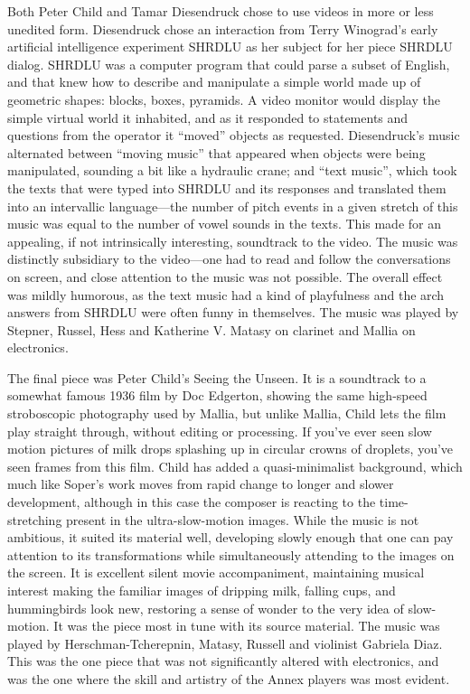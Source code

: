 Both Peter Child and Tamar Diesendruck chose to use videos in more or less unedited form. Diesendruck chose an interaction from Terry Winograd’s early artificial intelligence experiment SHRDLU as her subject for her piece SHRDLU dialog. SHRDLU was a computer program that could parse a subset of English, and that knew how to describe and manipulate a simple world made up of geometric shapes: blocks, boxes, pyramids. A video monitor would display the simple virtual world it inhabited, and as it responded to statements and questions from the operator it “moved” objects as requested. Diesendruck’s music alternated between “moving music” that appeared when objects were being manipulated, sounding a bit like a hydraulic crane; and “text music”, which took the texts that were typed into SHRDLU and its responses and translated them into an intervallic language—the number of pitch events in a given stretch of this music was equal to the number of vowel sounds in the texts. This made for an appealing, if not intrinsically interesting, soundtrack to the video. The music was distinctly subsidiary to the video—one had to read and follow the conversations on screen, and close attention to the music was not possible. The overall effect was mildly humorous, as the text music had a kind of playfulness and the arch answers from SHRDLU were often funny in themselves. The music was played by Stepner, Russel, Hess and Katherine V. Matasy on clarinet and Mallia on electronics.

The final piece was Peter Child’s Seeing the Unseen. It is a soundtrack to a somewhat famous 1936 film by Doc Edgerton, showing the same high-speed stroboscopic photography used by Mallia, but unlike Mallia, Child lets the film play straight through, without editing or processing. If you’ve ever seen slow motion pictures of milk drops splashing up in circular crowns of droplets, you’ve seen frames from this film. Child has added a quasi-minimalist background, which much like Soper’s work moves from rapid change to longer and slower development, although in this case the composer is reacting to the time-stretching present in the ultra-slow-motion images. While the music is not ambitious, it suited its material well, developing slowly enough that one can pay attention to its transformations while simultaneously attending to the images on the screen. It is excellent silent movie accompaniment, maintaining musical interest making the familiar images of dripping milk, falling cups, and hummingbirds look new, restoring a sense of wonder to the very idea of slow-motion. It was the piece most in tune with its source material. The music was played by Herschman-Tcherepnin, Matasy, Russell and violinist Gabriela Diaz. This was the one piece that was not significantly altered with electronics, and was the one where the skill and artistry of the Annex players was most evident.

